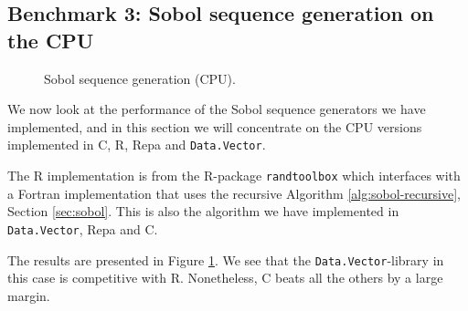 \subsection{Benchmark 3: Sobol sequence generation on the CPU}
\begin{figure}
	\centering
  \begin{adjustbox}{minipage=1.3\textwidth,margin=0pt \smallskipamount,center}
\end{adjustbox}
  \caption{Sobol sequence generation (CPU).}
\label{fig:sobol-cpu}
\end{figure}

We now look at the performance of the Sobol sequence generators we
have implemented, and in this section we will concentrate on the CPU
versions implemented in C, R, Repa and \lstinline{Data.Vector}. 

The R implementation is from the R-package \lstinline{randtoolbox}
which interfaces with a Fortran implementation that uses the recursive
Algorithm \ref{alg:sobol-recursive}, Section \ref{sec:sobol}. This is
also the algorithm we have implemented in \lstinline{Data.Vector},
Repa and C.

The results are presented in Figure \ref{fig:sobol-cpu}. We see that
the \texttt{Data.Vector}-library in this case is competitive with
R. Nonetheless, C beats all the others by a large margin.

